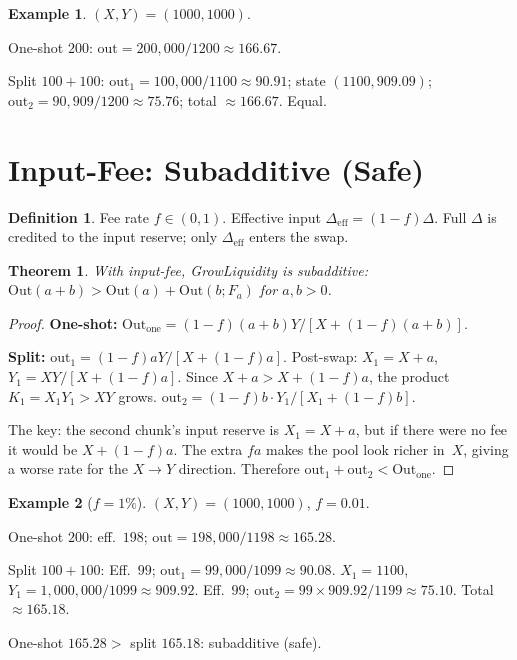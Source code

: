 \documentclass[11pt]{article}
\newtheorem{theorem}{Theorem}
\theoremstyle{definition}
\newtheorem{definition}{Definition}
\newtheorem{example}{Example}
\newcommand{\Out}{\mathrm{Out}}
\begin{document}
\begin{example}\label{ex:strict-num}
$(X,Y) = (1000, 1000)$.

One-shot $200$: $\mathrm{out} = 200{,}000 / 1200 \approx 166.67$.

Split $100 + 100$:
$\mathrm{out}_1 = 100{,}000/1100 \approx 90.91$;
state $(1100, 909.09)$;
$\mathrm{out}_2 = 90{,}909/1200 \approx 75.76$;
total $\approx 166.67$.  Equal. \checkmark
\end{example}


\section{Input-Fee: Subadditive (Safe)}\label{sec:input-fee}

\begin{definition}\label{def:input-fee}
Fee rate $f \in (0,1)$.  Effective input $\Delta_{\mathrm{eff}} = (1-f)\Delta$.
Full $\Delta$ is credited to the input reserve; only $\Delta_{\mathrm{eff}}$ enters
the swap.
\end{definition}

\begin{theorem}\label{thm:sub}
With input-fee, GrowLiquidity is subadditive:
$\Out(a+b) > \Out(a) + \Out(b; F_a)$ for $a,b > 0$.
\end{theorem}

\begin{proof}
\textbf{One-shot:}
$\Out_{\text{one}} = (1-f)(a+b)Y / [X + (1-f)(a+b)]$.

\textbf{Split:}
$\mathrm{out}_1 = (1-f)aY / [X + (1-f)a]$.
Post-swap: $X_1 = X + a$, $Y_1 = XY / [X + (1-f)a]$.
Since $X + a > X + (1-f)a$, the product $K_1 = X_1 Y_1 > XY$ grows.
$\mathrm{out}_2 = (1-f)b \cdot Y_1 / [X_1 + (1-f)b]$.

The key: the second chunk's input reserve is $X_1 = X + a$, but
if there were no fee it would be $X + (1-f)a$.
The extra $fa$ makes the pool look richer in~$X$, giving a worse rate for
the $X \to Y$ direction.
Therefore $\mathrm{out}_1 + \mathrm{out}_2 < \Out_{\text{one}}$.
\end{proof}

\begin{example}[$f = 1\%$]\label{ex:sub-num}
$(X,Y) = (1000, 1000)$, $f = 0.01$.

One-shot $200$: eff.\ $198$; $\mathrm{out} = 198{,}000/1198 \approx 165.28$.

Split $100 + 100$:
Eff.\ $99$; $\mathrm{out}_1 = 99{,}000/1099 \approx 90.08$.
$X_1 = 1100$, $Y_1 = 1{,}000{,}000/1099 \approx 909.92$.
Eff.\ $99$; $\mathrm{out}_2 = 99 \times 909.92/1199 \approx 75.10$.
Total $\approx 165.18$.

One-shot $165.28 > $ split $165.18$: subadditive (safe). \checkmark
\end{example}
\end{document}
